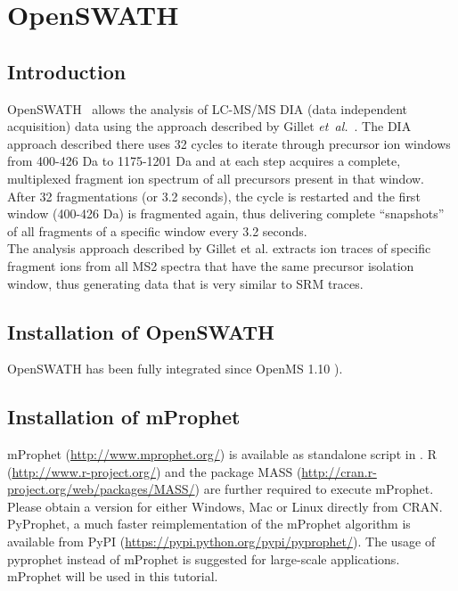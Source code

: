 
\newpage
\section{OpenSWATH}
\subsection{Introduction}

OpenSWATH~\cite{Rost2014fd} allows the analysis of LC-MS/MS DIA (data independent acquisition) data using the approach described by Gillet \textit{et~al.}~\cite{Gillet2012Targeted}. The DIA approach described there uses 32 cycles to iterate through precursor ion windows from 400-426 Da to 1175-1201 Da and at each step acquires a complete, multiplexed fragment ion spectrum of all precursors present in that window. After 32 fragmentations (or 3.2 seconds), the cycle is restarted and the first window (400-426 Da) is fragmented again, thus delivering complete ``snapshots'' of all fragments of a specific window every 3.2 seconds. \\

\noindent The analysis approach described by Gillet et al. extracts ion traces of specific fragment ions from all MS2 spectra that have the same precursor isolation window, thus generating data that is very similar to SRM traces.

\subsection{Installation of OpenSWATH}
OpenSWATH has been fully integrated since OpenMS 1.10 \cite{Kohlbacher2007,Sturm2008,Bertsch2011OpenMS,Rost2016,Pfeuffer2017}).

\subsection{Installation of mProphet}
mProphet (\url{http://www.mprophet.org/}) \cite{Reiter2011MProphet} is available as standalone script in . 
R (\url{http://www.r-project.org/}) and the package MASS (\url{http://cran.r-project.org/web/packages/MASS/}) are further required to execute mProphet. 
Please obtain a version for either Windows, Mac or Linux directly from CRAN. \\

\noindent PyProphet, a much faster reimplementation of the mProphet algorithm is available from PyPI (\url{https://pypi.python.org/pypi/pyprophet/}). The usage of pyprophet instead of mProphet is suggested for large-scale applications. \\ %
\newline \noindent mProphet will be used in this tutorial.

